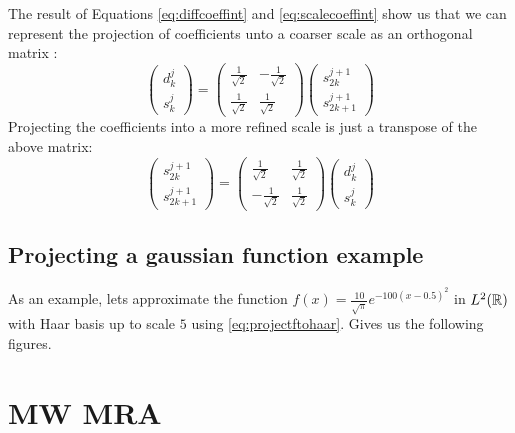\documentclass[../master_thesis.tex]{subfiles}
\begin{document}
The result of Equations \ref{eq:diffcoeffint} and \ref{eq:scalecoeffint} show us
that we can represent the projection of coefficients unto a coarser scale as an
orthogonal matrix \cite{Sorland, Beylkin:MRA}:
\begin{equation}
  \begin{pmatrix}
    d^{j}_k \\
    s^{j}_k
  \end{pmatrix} =
  \begin{pmatrix}
    \frac{1}{\sqrt{2}} & -\frac{1}{\sqrt{2}} \\
    \frac{1}{\sqrt{2}} & \frac{1}{\sqrt{2}}
  \end{pmatrix}
  \begin{pmatrix}
    s^{j+1}_{2k} \\
    s^{j+1}_{2k+1}
  \end{pmatrix}
\end{equation}
Projecting the coefficients into a more refined scale is just a transpose of the
above matrix:
\begin{equation}
  \begin{pmatrix}
    s^{j+1}_{2k} \\
    s^{j+1}_{2k+1}
  \end{pmatrix} =
  \begin{pmatrix}
    \frac{1}{\sqrt{2}} & \frac{1}{\sqrt{2}} \\
    -\frac{1}{\sqrt{2}} & \frac{1}{\sqrt{2}}
  \end{pmatrix}
  \begin{pmatrix}
    d^{j}_k \\
    s^{j}_k
  \end{pmatrix}
\end{equation}
\subsection{Projecting a gaussian function example}
As an example, lets approximate the function
$f(x) = \frac{10}{\sqrt{\pi}}e^{-100(x - 0.5)^2}$ in $L^2(\mathbb{R})$
with Haar basis up to scale $5$ using \ref{eq:projectftohaar}. Gives us the
following figures.

\section{\ac{MW} \ac{MRA}}
\end{document}
